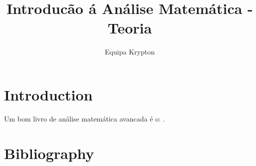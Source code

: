 \documentclass{article}
\title{Introducão á Análise Matemática - Teoria}
\author{Equipa Krypton}
\theoremstyle{definition}
\theoremstyle{remark}
\begin{document}
\maketitle

\section{Introduction}

Um bom livro de análise matemática avancada é o:  \cite{friedman1970foundations}.


\newpage
\section*{Bibliography}
\printbibliography
\end{document}

